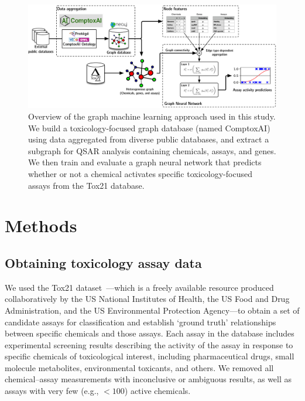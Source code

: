\documentclass{ws-procs11x85}
\begin{document}
\begin{figure}
   \centering
   \includegraphics[width=\textwidth]{figures/figure1.pdf}
   \caption{Overview of the graph machine learning approach used in this study. We build a toxicology-focused graph database (named ComptoxAI) using data aggregated from diverse public databases, and extract a subgraph for QSAR analysis containing chemicals, assays, and genes. We then train and evaluate a graph neural network that predicts whether or not a chemical activates specific toxicology-focused assays from the Tox21 database.}
\end{figure}

\section{Methods}

\subsection{Obtaining toxicology assay data}
We used the Tox21 dataset~\cite{tice2013improving}---which is a freely available resource produced collaboratively by the US National Institutes of Health, the US Food and Drug Administration, and the US Environmental Protection Agency---to obtain a set of candidate assays for classification and establish `ground truth' relationships between specific chemicals and those assays.
Each assay in the database includes experimental screening results describing the activity of the assay in response to specific chemicals of toxicological interest, including pharmaceutical drugs, small molecule metabolites, environmental toxicants, and others.
We removed all chemical--assay measurements with inconclusive or ambiguous results, as well as assays with very few (e.g., $<100$) active chemicals.
\end{document}
